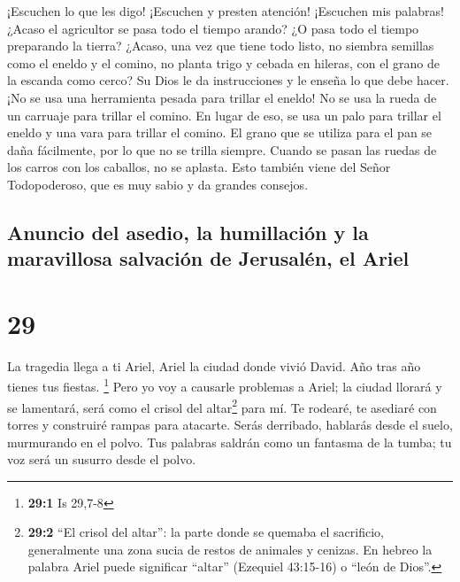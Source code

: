  ¡Escuchen lo que les digo! ¡Escuchen y presten atención!
¡Escuchen mis palabras!  ¿Acaso el agricultor se pasa
todo el tiempo arando? ¿O pasa todo el tiempo preparando la tierra?
 ¿Acaso, una vez que tiene todo listo, no siembra
semillas como el eneldo y el comino, no planta trigo y cebada en
hileras, con el grano de la escanda como cerco?  Su Dios
le da instrucciones y le enseña lo que debe hacer.  ¡No
se usa una herramienta pesada para trillar el eneldo! No se usa la rueda
de un carruaje para trillar el comino. En lugar de eso, se usa un palo
para trillar el eneldo y una vara para trillar el comino.
 El grano que se utiliza para el pan se daña fácilmente,
por lo que no se trilla siempre. Cuando se pasan las ruedas de los
carros con los caballos, no se aplasta.  Esto también
viene del Señor Todopoderoso, que es muy sabio y da grandes consejos.

\hypertarget{anuncio-del-asedio-la-humillaciuxf3n-y-la-maravillosa-salvaciuxf3n-de-jerusaluxe9n-el-ariel}{%
\subsection{Anuncio del asedio, la humillación y la maravillosa
salvación de Jerusalén, el
Ariel}\label{anuncio-del-asedio-la-humillaciuxf3n-y-la-maravillosa-salvaciuxf3n-de-jerusaluxe9n-el-ariel}}

\hypertarget{section-28}{%
\section{29}\label{section-28}}

 La tragedia llega a ti Ariel, Ariel la ciudad donde vivió
David. Año tras año tienes tus fiestas. \footnote{\textbf{29:1} Is
  29,7-8}  Pero yo voy a causarle problemas a Ariel; la
ciudad llorará y se lamentará, será como el crisol del altar\footnote{\textbf{29:2}
  ``El crisol del altar'': la parte donde se quemaba el sacrificio,
  generalmente una zona sucia de restos de animales y cenizas. En hebreo
  la palabra Ariel puede significar ``altar'' (Ezequiel 43:15-16) o
  ``león de Dios''.} para mí.  Te rodearé, te asediaré con
torres y construiré rampas para atacarte.  Serás
derribado, hablarás desde el suelo, murmurando en el polvo. Tus palabras
saldrán como un fantasma de la tumba; tu voz será un susurro desde el
polvo.

